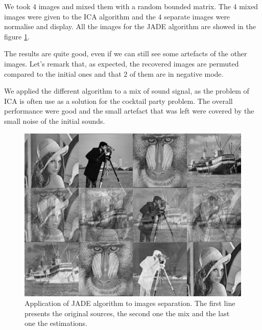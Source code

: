 \documentclass[a4paper]{article}
\begin{document}
We took $4$ images and mixed them with a random bounded matrix.
The $4$ mixed images were given to the ICA algorithm and the $4$ separate images were normalise and display.
All the images for the JADE algorithm are showed in the figure \ref{fig:res_images}.

The results are quite good, even if we can still see some artefacts of the other images. Let's remark that, as expected, the recovered images are permuted compared to the initial ones and that $2$ of them are in negative mode.

\znl

We applied the different algorithm to a mix of sound signal, as the problem of ICA is often use as a solution for the cocktail party problem. The overall performance were good and the small artefact that was left were covered by the small noise of the initial sounds.



\begin{figure}
\centering
\includegraphics[width=.74\textwidth]{../image_test/unmix4.png}
\caption{Application of JADE algorithm to images separation. The first line presents the original sources, the second one the mix and the last one the estimations.\label{fig:res_images}}
\end{figure}




{}
\nocite{*}

\label{lastpage}
\end{document}
